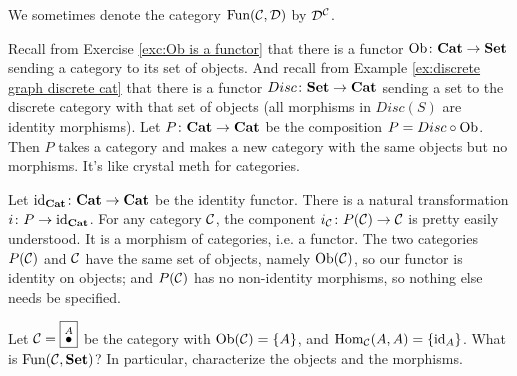 \documentclass[CT4S-EN-RU]{subfiles}
\begin{document}
\begin{proofRUS}
\end{proofRUS}

\begin{notationENG}
We sometimes denote the category $\textnormal{Fun}(\mathcal{C},\mathcal{D})$ by $\mathcal{D}^\mathcal{C}$. 
\end{notationENG}

\begin{notationRUS}
\end{notationRUS}

\begin{exampleENG}
Recall from Exercise \ref{exc:Ob is a functor} that there is a functor $\textnormal{Ob}\colon{\bf Cat}\rightarrow{\bf Set}$ sending a category to its set of objects. And recall from Example \ref{ex:discrete graph discrete cat} that there is a functor $Disc\colon{\bf Set}\rightarrow{\bf Cat}$ sending a set to the discrete category with that set of objects (all morphisms in $Disc(S)$ are identity morphisms). Let $P\colon{\bf Cat}\rightarrow{\bf Cat}$ be the composition $P=Disc\circ\textnormal{Ob}$. Then $P$ takes a category and makes a new category with the same objects but no morphisms. It's like crystal meth for categories.

Let $\textnormal{id}_{\bf Cat}\colon{\bf Cat}\rightarrow{\bf Cat}$ be the identity functor. There is a natural transformation $i\colon P\rightarrow\textnormal{id}_{\bf Cat}$. For any category $\mathcal{C}$, the component $i_\mathcal{C}\colon P(\mathcal{C})\rightarrow\mathcal{C}$ is pretty easily understood. It is a morphism of categories, i.e. a functor. The two categories $P(\mathcal{C})$ and $\mathcal{C}$ have the same set of objects, namely $\textnormal{Ob}(\mathcal{C})$, so our functor is identity on objects; and $P(\mathcal{C})$ has no non-identity morphisms, so nothing else needs be specified.
\end{exampleENG}

\begin{exampleRUS}
\end{exampleRUS}

\begin{exerciseENG}
Let $\mathcal{C}=\fbox{$\stackrel{A}{\bullet}$}$ be the category with $\textnormal{Ob}(\mathcal{C})=\{A\}$, and $\textnormal{Hom}_\mathcal{C}(A,A)=\{\textnormal{id}_A\}$. What is $\textnormal{Fun}(\mathcal{C},{\bf Set})$? In particular, characterize the objects and the morphisms.
\end{exerciseENG}

\begin{exerciseRUS}
\end{exerciseRUS}
\end{document}
